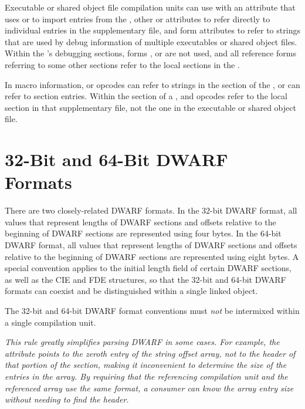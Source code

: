 Executable or shared object file compilation units can use
\DWTAGimportedunit{} with 
an \DWATimport{} attribute that uses \DWFORMrefsupfour{} or \DWFORMrefsupeight{} 
to import entries from the , other 
\DWFORMrefsupfour{} or \DWFORMrefsupeight{} attributes to refer 
directly to individual entries in the supplementary file, 
and \DWFORMstrpsup{} form attributes to
refer to strings that are used by debug information of multiple
executables or shared object files.  Within the 's
debugging sections, forms \DWFORMrefsupfour{}, \DWFORMrefsupeight{} 
or \DWFORMstrpsup{} are
not used, and all reference forms referring to some other sections
refer to the local sections in the .

In macro information, \DWMACROdefinesup{} or
\DWMACROundefsup{} opcodes can refer to strings in the 
\dotdebugstr{} section of the , 
or \DWMACROimportsup{} 
can refer to \dotdebugmacro{} section entries.  Within the 
\dotdebugmacro{} section of a , 
\DWMACROdefinestrp{} and \DWMACROundefstrp{}
opcodes refer to the local \dotdebugstr{} section in that
supplementary file, not the one in
the executable or shared object file.


\section{32-Bit and 64-Bit DWARF Formats}
\label{datarep:32bitand64bitdwarfformats}
\hypertarget{datarep:xxbitdwffmt}{}
There are two closely-related DWARF
formats. In the 32-bit DWARF
format, all values that represent lengths of DWARF sections
and offsets relative to the beginning of DWARF sections are
represented using four bytes. In the 64-bit DWARF format, all
values that represent lengths of DWARF sections and offsets
relative to the beginning of DWARF sections are represented
using eight bytes. A special convention applies to the initial
length field of certain DWARF sections, as well as the CIE and
FDE structures, so that the 32-bit and 64-bit DWARF formats
can coexist and be distinguished within a single linked object.

\bb
The 32-bit and 64-bit DWARF format conventions must \emph{not} be
intermixed within a single compilation unit.

\textit{This rule greatly simplifies parsing DWARF in some cases.  
For example, the \DWATstroffsetsbase{} attribute points to the 
zeroth entry of the string offset array, not to the header of that 
portion of the \dotdebugstroffsets{} section, making it inconvenient 
to determine the size of the entries in the array.  By requiring 
that the referencing compilation unit and the referenced array use 
the same format, a consumer can know the array entry size without
needing to find the \dotdebugstroffsets{} header.}
\eb

